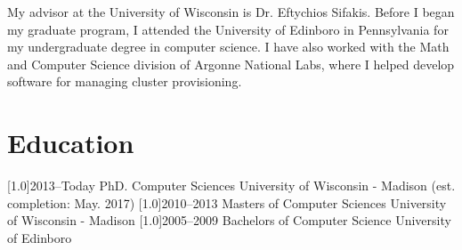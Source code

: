 \documentclass{cv-style}     %
\begin{document}
My advisor at the University of Wisconsin is Dr. Eftychios Sifakis. Before
I began my graduate program, I attended the University of Edinboro in
Pennsylvania for my undergraduate degree in computer science. I have
also worked with the Math and Computer Science division of Argonne
National Labs, where I helped develop software for managing cluster
provisioning.

\section{Education}
  \vspace{-0.2cm}
\begin{entrylist}
\entry
{\scalebox{.8}[1.0]{2013--Today}}
{PhD. Computer Sciences}
{University of Wisconsin - Madison}
{(est. completion: May. 2017)}
\entry
{\scalebox{.8}[1.0]{2010--2013}}
{Masters of Computer Sciences}
{University of Wisconsin - Madison}
{}
\entry
{\scalebox{.8}[1.0]{2005--2009}}
{Bachelors of Computer Science}
{University of Edinboro}
{}
\end{entrylist}
  \vspace{-0.2cm}
\end{document}
